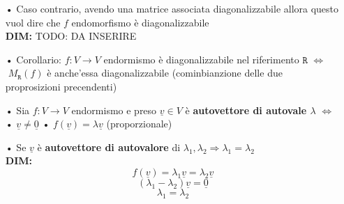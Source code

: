 \begin{itemize}
\item[•] Caso contrario, avendo una matrice associata diagonalizzabile allora questo vuol dire che $f$ endomorfismo è diagonalizzabile\\
\textbf{DIM:}
TODO: DA INSERIRE

\item[•] Corollario: $f: V \rightarrow V$ endormismo è diagonalizzabile nel riferimento $\mathtt{R}$ $\Leftrightarrow$ $\; M_{\mathtt{R}}(f)$ è anche'essa diagonalizzabile (cominbianzione delle due proprosizioni precendenti)\\

\item[•] Sia $f: V \rightarrow V$ endormismo e preso $\underline{v} \in V$ è \textbf{autovettore di autovale $\lambda$} $\Leftrightarrow$
\subitem • $\underline{v} \neq \underline{0}$
\subitem • $f(\underline{v}) = \lambda \underline{v}$ (proporzionale)

\item[•] Se $\underline{v}$ è \textbf{autovettore di autovalore} di $\lambda_1, \lambda_2 \Rightarrow \lambda_1=\lambda_2$\\
\textbf{DIM:}
$$ f(\underline{v}) = \lambda_1 \underline{v} = \lambda_2 \underline{v} $$
$$ (\lambda_1-\lambda_2)\underline{v} = \underline{0} $$
$$ \lambda_1 = \lambda_2 $$


\end{itemize}








